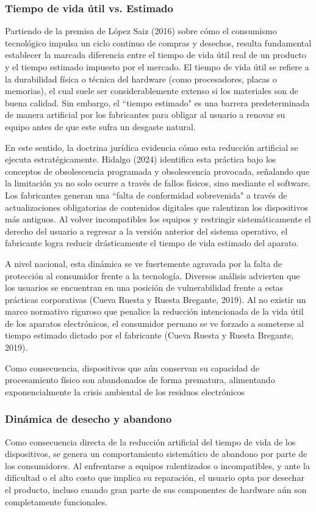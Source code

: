 \documentclass[stu,12pt,a4paper]{apa7}
\begin{document}
    \subsubsection{Tiempo de vida útil vs. Estimado}
Partiendo de la premisa de López Saiz (2016) sobre cómo el consumismo tecnológico impulsa un ciclo continuo de compras y desechos, resulta fundamental establecer la marcada diferencia entre el tiempo de vida útil real de un producto y el tiempo estimado impuesto por el mercado. El tiempo de vida útil se refiere a la durabilidad física o técnica del hardware (como procesadores, placas o memorias), el cual suele ser considerablemente extenso si los materiales son de buena calidad. Sin embargo, el ``tiempo estimado" es una barrera predeterminada de manera artificial por los fabricantes para obligar al usuario a renovar su equipo antes de que este sufra un desgaste natural.

En este sentido, la doctrina jurídica evidencia cómo esta reducción artificial se ejecuta estratégicamente. Hidalgo (2024) identifica esta práctica bajo los conceptos de obsolescencia programada y obsolescencia provocada, señalando que la limitación ya no solo ocurre a través de fallos físicos, sino mediante el software. Los fabricantes generan una ``falta de conformidad sobrevenida" a través de actualizaciones obligatorias de contenidos digitales que ralentizan los dispositivos más antiguos. Al volver incompatibles los equipos y restringir sistemáticamente el derecho del usuario a regresar a la versión anterior del sistema operativo, el fabricante logra reducir drásticamente el tiempo de vida estimado del aparato.

A nivel nacional, esta dinámica se ve fuertemente agravada por la falta de protección al consumidor frente a la tecnología. Diversos análisis advierten que los usuarios se encuentran en una posición de vulnerabilidad frente a estas prácticas corporativas (Cueva Ruesta y Ruesta Bregante, 2019). Al no existir un marco normativo riguroso que penalice la reducción intencionada de la vida útil de los aparatos electrónicos, el consumidor peruano se ve forzado a someterse al tiempo estimado dictado por el fabricante (Cueva Ruesta y Ruesta Bregante, 2019).

Como consecuencia, dispositivos que aún conservan su capacidad de procesamiento físico son abandonados de forma prematura, alimentando exponencialmente la crisis ambiental de los residuos electrónicos

    \subsubsection{Dinámica de desecho y abandono}
Como consecuencia directa de la reducción artificial del tiempo de vida de los dispositivos, se genera un comportamiento sistemático de abandono por parte de los consumidores. Al enfrentarse a equipos ralentizados o incompatibles, y ante la dificultad o el alto costo que implica su reparación, el usuario opta por desechar el producto, incluso cuando gran parte de sus componentes de hardware aún son completamente funcionales.
\end{document}
